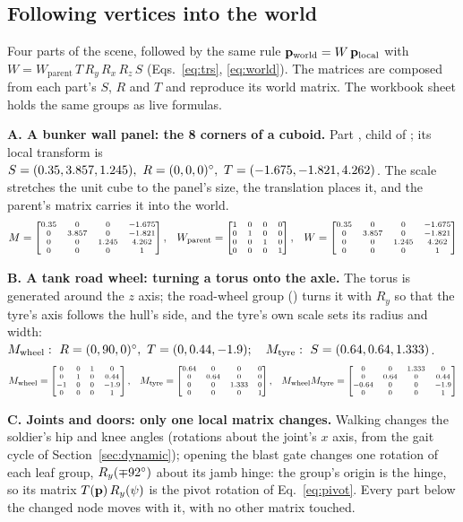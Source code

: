 \subsection{Following vertices into the world}
\label{sec:worked}
Four parts of the scene, followed by the same rule $\mathbf{p}_{\text{world}}=W\,\mathbf{p}_{\text{local}}$ with
$W=W_{\text{parent}}\,T\,R_y\,R_x\,R_z\,S$ (Eqs.~\eqref{eq:trs}, \ref{eq:world}). The matrices are composed from each
part's $S$, $R$ and $T$ and reproduce its world matrix. The workbook sheet  holds the same groups as live formulas.

\textbf{A. A bunker wall panel: the 8 corners of a cuboid.} Part \wgAname, child of \wgAparent; its local
transform is $S=(0.35, 3.857, 1.245),\ R=(0, 0, 0)^\circ,\ T=(-1.675, -1.821, 4.262)$. The scale stretches the unit cube to the panel's size, the translation places it, and the
parent's matrix carries it into the world.
\[\scriptsize M=\begin{bmatrix}0.35&0&0&-1.675\\0&3.857&0&-1.821\\0&0&1.245&4.262\\0&0&0&1\end{bmatrix},\quad W_{\text{parent}}=\begin{bmatrix}1&0&0&0\\0&1&0&0\\0&0&1&0\\0&0&0&1\end{bmatrix},\quad W=\begin{bmatrix}0.35&0&0&-1.675\\0&3.857&0&-1.821\\0&0&1.245&4.262\\0&0&0&1\end{bmatrix}\]

\begin{table}[htbp]
\caption{Group A: the cube's corners $v_0..v_7$ (Figure~\ref{fig:card-cube}) and where they land in the world.}\label{tab:wgA}
\centering\footnotesize\wgA
\end{table}

\textbf{B. A tank road wheel: turning a torus onto the axle.} The torus is generated around the $z$ axis; the
road-wheel group (\wgBname) turns it with $R_y$ so that the tyre's axis follows the hull's side, and the tyre's own scale
sets its radius and width: $M_{\text{wheel}}:\ R=(0, 90, 0)^\circ,\ T=(0, 0.44, -1.9);\quad M_{\text{tyre}}:\ S=(0.64, 0.64, 1.333)$.
\[\scriptsize M_{\text{wheel}}=\begin{bmatrix}0&0&1&0\\0&1&0&0.44\\-1&0&0&-1.9\\0&0&0&1\end{bmatrix},\quad M_{\text{tyre}}=\begin{bmatrix}0.64&0&0&0\\0&0.64&0&0\\0&0&1.333&0\\0&0&0&1\end{bmatrix},\quad M_{\text{wheel}}M_{\text{tyre}}=\begin{bmatrix}0&0&1.333&0\\0&0.64&0&0.44\\-0.64&0&0&-1.9\\0&0&0&1\end{bmatrix}\]

\begin{table}[htbp]
\caption{Group B: points of the unit torus through the tyre's and wheel's matrices, then into the world; the tyre's
axis in world space is $\wgBaxle$.}\label{tab:wgB}
\centering\footnotesize\wgB
\end{table}

\textbf{C. Joints and doors: only one local matrix changes.} Walking changes the soldier's hip and knee angles
(rotations about the joint's $x$ axis, from the gait cycle of Section~\ref{sec:dynamic}); opening the blast gate
changes one rotation of each leaf group, $R_y(\mp92^\circ)$ about its jamb hinge: the group's origin is the
hinge, so its matrix $T(\mathbf{p})\,R_y(\psi)$ is the pivot rotation of Eq.~\eqref{eq:pivot}. Every part below the changed
node moves with it, with no other matrix touched.

\begin{table}[htbp]
\caption{Group C. Top: soldier 1's left leg in the exported standing pose and at the gait phase with the most knee
bend (pelvis held still); the ankle is $(0,-0.44,0)$ in the knee's frame.}\label{tab:wgC}
\centering\footnotesize\wgC\\[2mm]\wgCdoor
\end{table}

